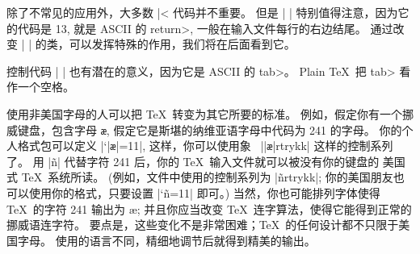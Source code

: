 {%
\danger 除了不常见的应用外，大多数 |^^| 代码并不重要。%
但是 |^^M| 特别值得注意，因为它的代码是 13, 就是 ASCII 的 \<return>,
一般在输入文件每行的右边结尾。%
通过改变 |^^M| 的类，可以发挥特殊的作用，我们将在后面看到它。

\danger 控制代码 |^^I| 也有潜在的意义，因为它是 ASCII 的 \<tab>。%
Plain \TeX\ 把 \<tab> 看作一个空格。

\ddanger 使用非美国字母的人可以把 \TeX\ 转变为其它所要的标准。%
例如，假定你有一个挪威键盘，包含字母 {\tt\ae},
假定它是斯堪的纳维亚语字母中代码为 241 的字母。%
你的个人格式包可以定义 |\catcode`|{\tt\ae}|=11|, 这样，你可以使用象%
~|\s|{\tt\ae}|rtrykk| 这样的控制系列了。%
用 |^^f1| 代替字符 241 后，你的 \TeX\ 输入文件就可以被没有你的键盘的%
美国式 \TeX\ 系统所读。%
(例如，文件中使用的控制系列为 |\s^^f1rtrykk|;
你的美国朋友也可以使用你的格式，只要设置 |\catcode`^^f1=11| 即可。)
当然，你也可能排列字体使得 \TeX\ 的字符 241 输出为 {\ae};
并且你应当改变 \TeX\ 连字算法，使得它能得到正常的挪威语连字符。%
要点是，这些变化不是非常困难；\TeX\ 的任何设计都不只限于美国字母。%
使用的语言不同，精细地调节后就得到精美的输出。

}
